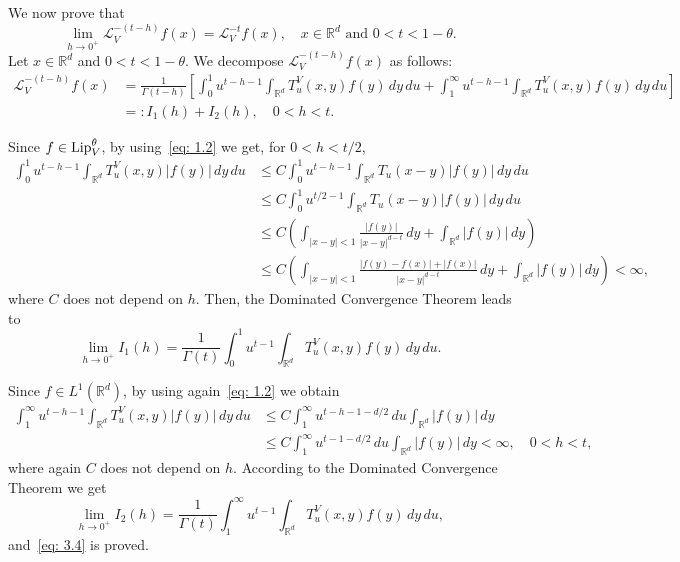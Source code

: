\documentclass[10pt, a4paper, reqno]{amsart}
\theoremstyle{definition}
\theoremstyle{remark}
\numberwithin{equation}{section}
\begin{document}
We now prove that 
\begin{equation}\label{eq: 3.4}
\lim_{h \rightarrow 0^+} \mathcal{L}_V^{-(t-h)} f(x) = \mathcal{L}_V^{-t} f(x), \quad x \in \mathbb{R}^d \text{ and } 0 < t < 1-\theta.     
\end{equation}
Let $x \in \mathbb{R}^d$ and $0 < t < 1-\theta$. We decompose $\mathcal{L}_V^{-(t-h)} f(x)$ as follows:
\begin{equation*}
    \begin{split}
        \mathcal{L}_V^{-(t-h)} f(x) & = \frac{1}{\Gamma(t-h)} \left[
        \int_0^1 u^{t-h-1} \int_{\mathbb{R}^d} T_u^V(x,y) f(y) \, dy \, du + \int_1^\infty u^{t-h-1} \int_{\mathbb{R}^d} T_u^V(x,y) f(y) \, dy \, du \right] \\
        & =: I_1(h) + I_2(h), \quad 0 < h < t.
    \end{split}
\end{equation*}

Since $f \in \textup{Lip}_V^{\theta}$, by using~\eqref{eq: 1.2} we get, {for $0 < h < t/2$},
\begin{equation}\label{eq: 3.5}
    \begin{split}
        \int_0^1 u^{t-h-1} \int_{\mathbb{R}^d} T_u^V(x,y) |f(y)| \, dy \, du & \leq C \int_0^1 u^{t-h-1} \int_{\mathbb{R}^d} T_u(x-y) |f(y)| \, dy \, du \\
        & \leq C \int_0^1 u^{t/2-1} \int_{\mathbb{R}^d} T_u(x-y) |f(y)| \, dy \, du \\
        & \leq C \left( \int_{|x-y|<1} \frac{|f(y)|}{|x-y|^{d-t}} \, dy + \int_{\mathbb{R}^d} |f(y)| \, dy \right) \\
        & \leq C \left( \int_{|x-y|<1} \frac{|f(y)-f(x)| + |f(x)|}{|x-y|^{d-t}} \, dy + \int_{\mathbb{R}^d} |f(y)| \, dy \right) < \infty,
    \end{split}
\end{equation}
where $C$ does not depend on $h$. Then, the Dominated Convergence Theorem leads to
\begin{equation*}
    \lim_{h \rightarrow 0^+} I_1(h) = \frac{1}{\Gamma(t)} \int_0^1 u^{t-1} \int_{\mathbb{R}^d} T_u^V(x,y) f(y) \, dy \, du.
\end{equation*}

Since $f \in L^1(\mathbb{R}^d)$, by using again~\eqref{eq: 1.2} we obtain
\begin{equation}\label{eq: 3.6}
    \begin{split}
        \int_1^\infty u^{t-h-1} \int_{\mathbb{R}^d} T_u^V(x,y) |f(y)| \, dy \, du  & \leq C \int_1^\infty u^{t-h-1-d/2} \, du \int_{\mathbb{R}^d} |f(y)| \, dy \\
        & \leq C \int_1^\infty u^{t-1-d/2} \, du \int_{\mathbb{R}^d} |f(y)| \, dy < \infty, \quad 0 < h < t, 
    \end{split}
\end{equation}
where again $C$ does not depend on $h$. According to the Dominated Convergence Theorem we get
\begin{equation*}
    \lim_{h \rightarrow 0^+} I_2(h) = \frac{1}{\Gamma(t)} \int_{1}^{\infty} u^{t-1} \int_{\mathbb{R}^d} T_u^V(x,y) f(y) \, dy \, du,
\end{equation*}
and~\eqref{eq: 3.4} is proved.
\end{document}

